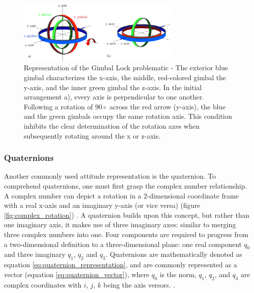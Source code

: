 \begin{figure}[!h]
    \centering
    \includegraphics[width=0.7\textwidth]{figures/gimbal_lock.png}
    \caption{Representation of the Gimbal Lock problematic \cite{zeitlhofler2019nominal} - The exterior blue gimbal characterizes the x-axis, the middle, red-colored gimbal the y-axis, and the inner green gimbal the z-axis. In the initial arrangement a), every axis is perpendicular to one another. Following a rotation of $90\circ$ across the red arrow (y-axis), the blue and the green gimbals occupy the same rotation axis. This condition inhibits the clear determination of the rotation axes when subsequently rotating around the x or z-axis. }
    \label{fig:gimbal_lock}
\end{figure}

\subsubsection{Quaternions}

Another commonly used attitude representation is the quaternion. To comprehend quaternions, one must first grasp the complex number relationship. A complex number can depict a rotation in a 2-dimensional coordinate frame with a real x-axis and an imaginary y-axis (or vice versa) (figure \ref{fig:complex_rotation}) \cite{lee2008representing}. A quaternion builds upon this concept, but rather than one imaginary axis, it makes use of three imaginary axes: similar to merging three complex numbers into one. Four components are required to progress from a two-dimensional definition to a three-dimensional plane: one real component $q_0$ and three imaginary $q_1$, $q_2$ and $q_3$. Quaternions are mathematically denoted as equation \ref{eq:quaternion_representation}, and are commonly represented as a vector (equation \ref{eq:quaternion_vector}), where $q_0$ is the norm, $q_1$, $q_2$, and $q_3$ are complex coordinates with $i$, $j$, $k$ being the axis versors.  \cite{mukundan2002quaternions}.

